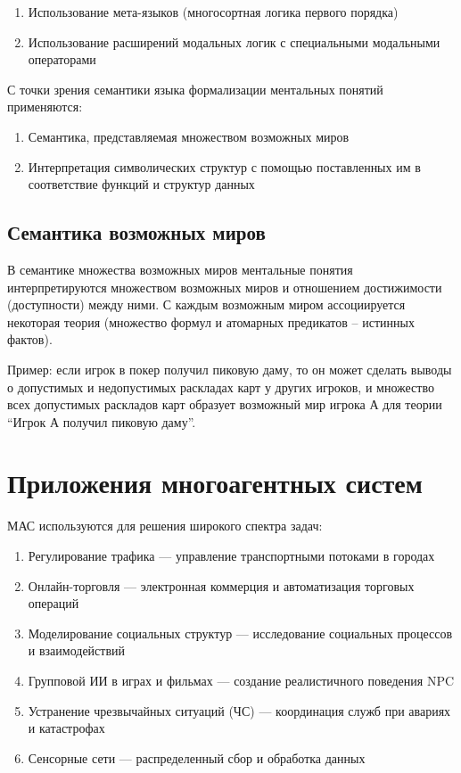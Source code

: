 \begin{enumerate}
  \item Использование мета-языков (многосортная логика первого порядка)
  \item Использование расширений модальных логик с специальными модальными операторами
\end{enumerate}

С точки зрения семантики языка формализации ментальных понятий применяются:

\begin{enumerate}
  \item Семантика, представляемая множеством возможных миров
  \item Интерпретация символических структур с помощью поставленных им в соответствие функций и структур данных
\end{enumerate}

\subsection{Семантика возможных миров}

В семантике множества возможных миров ментальные понятия интерпретируются множеством возможных миров и отношением достижимости (доступности) между ними. С каждым возможным миром ассоциируется некоторая теория (множество формул и атомарных предикатов – истинных фактов).

Пример: если игрок в покер получил пиковую даму, то он может сделать выводы о допустимых и недопустимых раскладах карт у других игроков, и множество всех допустимых раскладов карт образует возможный мир игрока А для теории ``Игрок А получил пиковую даму''.

\section{Приложения многоагентных систем}

МАС используются для решения широкого спектра задач:

\begin{enumerate}
  \item Регулирование трафика — управление транспортными потоками в городах
  \item Онлайн-торговля — электронная коммерция и автоматизация торговых операций
  \item Моделирование социальных структур — исследование социальных процессов и взаимодействий
  \item Групповой ИИ в играх и фильмах — создание реалистичного поведения NPC
  \item Устранение чрезвычайных ситуаций (ЧС) — координация служб при авариях и катастрофах
  \item Сенсорные сети — распределенный сбор и обработка данных
\end{enumerate}

